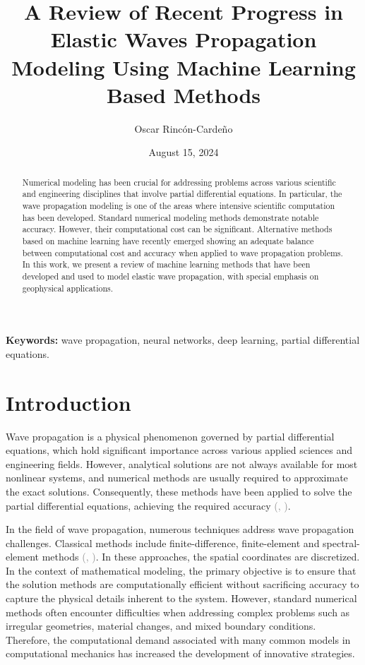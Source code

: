\documentclass{tufte-handout}
\title[Modeling of Wave Propagation]{A Review of Recent Progress in Elastic Waves Propagation Modeling Using Machine Learning Based Methods}
\author[Oscar Rincón-Cardeño]{Oscar Rincón-Cardeño}
\date{August 15, 2024} %
\providecommand{\keywords}[1]
{
  \small	
  \textbf{{Keywords:}} #1
}
\renewcommand{\citep}[2][]{\textcolor{gray}{(\citeauthor{#2}, \citeyear[#1]{#2})}}
\begin{document}
\maketitle

\begin{abstract}
\noindent
Numerical modeling has been crucial for addressing problems across various scientific and engineering disciplines that involve partial differential equations. In particular, the wave propagation modeling is one of the areas where intensive scientific computation has been developed. Standard numerical modeling methods demonstrate notable accuracy. However, their computational cost can be significant. Alternative methods based on machine learning have recently emerged showing an adequate balance between computational cost and accuracy when applied to wave propagation problems. In this work, we present a review of machine learning methods that have been developed and used to model elastic wave propagation, with special emphasis on geophysical applications.
\end{abstract}
\keywords{wave propagation, neural networks, deep learning, partial differential equations.}

\section{Introduction}

Wave propagation is a physical phenomenon governed by partial differential equations, which hold significant importance across various applied sciences and engineering fields. However, analytical solutions are not always available for most nonlinear systems, and numerical methods are usually required to approximate the exact solutions. Consequently, these methods have been applied to solve the partial differential equations, achieving the required accuracy \citep{Seriani2020}.

In the field of wave propagation, numerous techniques address wave propagation challenges. Classical methods include finite-difference, finite-element and spectral-element methods \citep{Moczo, virieux_review_2011, Igel2017,komatitsch_introduction_1999,chaljub_spectral-element_2007}. In these approaches, the spatial coordinates are discretized. In the context of mathematical modeling, the primary objective is to ensure that the solution methods are computationally efficient without sacrificing accuracy to capture the physical details inherent to the system. However, standard numerical methods often encounter difficulties when addressing complex problems such as irregular geometries, material changes, and mixed boundary conditions. Therefore, the computational demand associated with many common models in computational mechanics has increased the development of innovative strategies.
\end{document}
